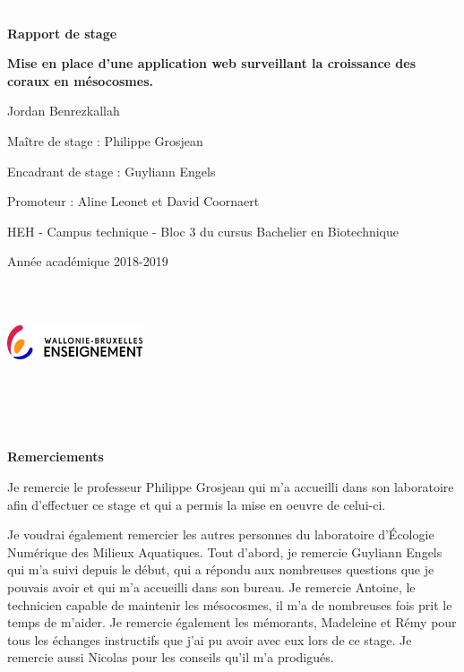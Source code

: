\documentclass[]{report}
\begin{document}
\begin{centering}
\textcolor{white}{.}

\vspace{2.0 cm}

\Huge

{\bf Rapport de stage}

\vspace{1 cm}

\huge 
{\bf Mise en place d'une application web surveillant la croissance des coraux en mésocosmes.}

\vspace{1 cm}

\Large

Jordan Benrezkallah

\vspace{2 cm}

\normalsize
Maître de stage : Philippe Grosjean

Encadrant de stage : Guyliann Engels

Promoteur : Aline Leonet et David Coornaert


\vspace{2.5 cm}

\normalsize
HEH - Campus technique -
Bloc 3 du cursus Bachelier en Biotechnique

Année académique 2018-2019

\end {centering}

\includegraphics[width=4cm, height=3.5cm]{../image/fede.jpg}

\newpage

\null

\textcolor{white}{.}

\Huge 
{\bf Remerciements} \vspace{1 cm}

\normalsize
Je remercie le professeur Philippe Grosjean qui m'a accueilli dans son
laboratoire afin d'effectuer ce stage et qui a permis la mise en oeuvre
de celui-ci.

Je voudrai également remercier les autres personnes du laboratoire
d'Écologie Numérique des Milieux Aquatiques. Tout d'abord, je remercie
Guyliann Engels qui m'a suivi depuis le début, qui a répondu aux
nombreuses questions que je pouvais avoir et qui m'a accueilli dans son
bureau. Je remercie Antoine, le technicien capable de maintenir les
mésocosmes, il m'a de nombreuses fois prit le temps de m'aider. Je
remercie également les mémorants, Madeleine et Rémy pour tous les
échanges instructifs que j'ai pu avoir avec eux lors de ce stage. Je
remercie aussi Nicolas pour les conseils qu'il m'a prodigués.
\end{document}
